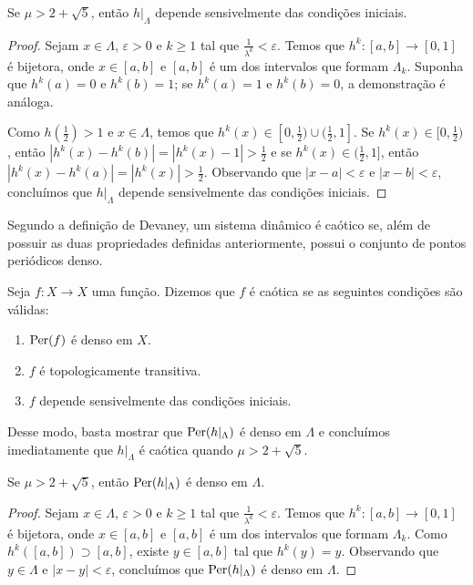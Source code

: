 \begin{proposition}
Se $\mu > 2 + \sqrt{5}$, então $h|_\Lambda$ depende sensivelmente das condições iniciais.
\end{proposition}

\begin{proof}
Sejam $x \in \Lambda$, $\varepsilon > 0$ e $k \geq 1$ tal que $\frac{1}{\lambda^k} < \varepsilon$.
Temos que $h^k: [a, b] \to [0, 1]$ é bijetora, onde $x \in [a, b]$ e $[a, b]$ é um dos intervalos que formam $\Lambda_k$. Suponha que $h^k(a) = 0$ e $h^k(b) = 1$; se $h^k(a) = 1$ e $h^k(b) = 0$, a demonstração é análoga.

Como $h(\frac{1}{2}) > 1$ e $x \in \Lambda$, temos que $h^{k}(x) \in [0, \frac{1}{2}) \cup (\frac{1}{2}, 1]$. Se $h^{k}(x) \in [0, \frac{1}{2})$, então $|h^k(x) - h^k(b)| = |h^k(x) - 1| > \frac{1}{2}$ e se $h^{k}(x) \in (\frac{1}{2}, 1]$, então $|h^k(x) - h^k(a)| = |h^k(x)| > \frac{1}{2}$. Observando que $|x - a| < \varepsilon$ e  $|x - b| < \varepsilon$, concluímos que $h|_\Lambda$ depende sensivelmente das condições iniciais.
\end{proof}

Segundo a definição de Devaney, um sistema dinâmico é caótico se, além de possuir as duas propriedades definidas anteriormente, possui o conjunto de pontos periódicos denso. 

\begin{definition}
Seja $f: X \to X$ uma função. Dizemos que $f$ é caótica se as seguintes condições são válidas:
\begin{enumerate}[label=\roman*.]
\item $\operatorname{Per}(f)$ é denso em $X$.
\item $f$ é topologicamente transitiva.
\item $f$ depende sensivelmente das condições iniciais.
\end{enumerate}
\end{definition}

Desse modo, basta mostrar que $\operatorname{Per}(h|_\Lambda)$ é denso em $\Lambda$ e concluímos imediatamente que $h|_\Lambda$ é caótica quando $\mu > 2 + \sqrt{5}$.

\begin{proposition}
Se $\mu > 2 + \sqrt{5}$, então $\operatorname{Per}(h|_\Lambda)$ é denso em $\Lambda$.
\end{proposition}

\begin{proof}
Sejam $x \in \Lambda$, $\varepsilon > 0$ e $k \geq 1$ tal que $\frac{1}{\lambda^k} < \varepsilon$.
Temos que $h^k: [a, b] \to [0, 1]$ é bijetora, onde $x \in [a, b]$ e $[a, b]$ é um dos intervalos que formam $\Lambda_k$.
Como $h^k([a, b]) \supset [a, b]$, existe $y \in [a, b]$ tal que $h^k(y) = y$. Observando que $y \in \Lambda$ e $|x - y| < \varepsilon$, concluímos que $\operatorname{Per}(h|_\Lambda)$ é denso em $\Lambda$.
\end{proof}

